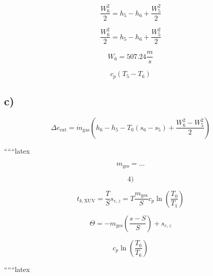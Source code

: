 \[
\frac{W_6^2}{2} = h_5 - h_6 + \frac{W_5^2}{2}
\]

\[
\frac{W_6^2}{2} = h_5 - h_6 + \frac{W_5^2}{2}
\]

\[
W_6 = 507.24 \frac{m}{s}
\]

\[
c_p (T_5 - T_6)
\]

\subsection*{c)}

\[
\Delta e_{\text{ext}} = \dot{m}_{\text{gas}} \left( h_6 - h_5 - T_0 (s_6 - s_5) + \frac{W_6^2 - W_5^2}{2} \right)
\]

``````latex

\[
m_{\text{ges}} = \dots
\]

\[
4)
\]

\[
t_{k, \text{XUV}} = \frac{T}{S} s_{e, z} = T \frac{m_{\text{ges}}}{S} c_p \ln \left( \frac{T_0}{T_1} \right)
\]

\[
\Theta = -m_{\text{ges}} \left( \frac{s - S}{S} \right) + s_{e, z}
\]

\[
c_p \ln \left( \frac{T_0}{T_6} \right)
\]

``````latex


